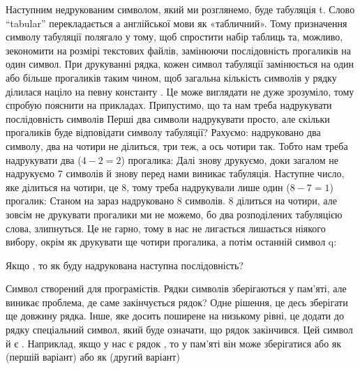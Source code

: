 Наступним недрукованим символом, який ми розглянемо, буде табуляція \chesc t.
Слово “tabular” перекладається а англійської мови як «табличний».
Тому призначення символу табуляції полягало у тому, щоб спростити набір таблиць та, можливо, зекономити на розмірі текстових файлів, замінюючи послідовність прогаликів на один символ.
При друкуванні рядка, кожен символ табуляції замінюється на один або більше прогаликів таким чином, щоб загальна кількість символів у рядку ділилася націло на певну константу .
Це може виглядати не дуже зрозуміло, тому спробую пояснити на прикладах.
Припустимо, що  та нам треба надрукувати послідовність символів
Перші два символи надрукувати просто, але скільки прогаликів буде відповідати символу табуляції?
Рахуємо: надруковано два символу, два на чотири не ділиться, три теж, а ось чотири так.
Тобто нам треба надрукувати два ($4-2=2$) прогалика:
\textseq{\id{12\s\s}}
Далі знову друкуємо, доки загалом не надрукуємо $7$ символів й знову перед нами виникає табуляція.
Наступне число, яке ділиться на чотири, це $8$, тому треба надрукували лише один ($8-7=1$) прогалик:
\textseq{\id{12\s\s{}123\s}}
\noindent Станом на зараз надруковано $8$ символів.
$8$ ділиться на чотири, але зовсім не друкувати прогалики ми не можемо, бо два розподілених табуляцією слова, злипнуться.
Це не гарно, тому в нас не лигається лишається ніякого вибору, окрім як друкувати ще чотири прогалика, а потім останній символ \chr q:

\goodbreak
\begin{exercise}
Якщо , то як буду надрукована наступна послідовність?
\end{exercise}

Символ  створений для програмістів.
Рядки символів зберігаються у пам'яті, але виникає проблема, де саме закінчується рядок?
Одне рішення, це десь зберігати ще довжину рядка.
Інше, яке досить поширене на низькому рівні, це додати до рядку спеціальний символ, який буде означати, що рядок закінчився.
Цей символ й є .
Наприклад, якщо у нас є рядок , то у пам'яті він може зберігатися або як (першій варіант)
\noindent або як (другий варіант)

